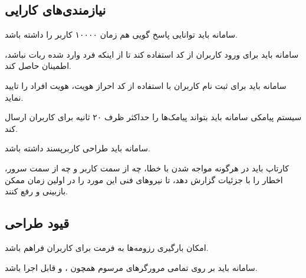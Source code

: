 \documentclass[12pt,svgnames,oneside]{book}
\newcounter{itemadded}
\let\LaTeXStandardEnumerateBegin\enumerate
\let\LaTeXStandardEnumerateEnd\endenumerate
\renewenvironment{enumerate}{%
\LaTeXStandardEnumerateBegin%
\setcounter{itemadded}{0}
}{%
\LaTeXStandardEnumerateEnd%
}%
\begin{document}
\subsection{نیازمندی‌های کارایی}
\begin{enumerate}
\item
سامانه باید توانایی پاسخ گویی هم زمان ۱۰۰۰۰ کاربر را داشته باشد.
\item
سامانه باید برای ورود کاربران از کد 
استفاده کند تا از اینکه فرد وارد شده ربات نباشد، اطمینان حاصل کند.
\item
سامانه باید برای ثبت نام کاربران با استفاده از کد احراز هویت، هویت افراد را تایید نماید.
\item
سیستم پیامکی سامانه باید بتواند پیامک‌ها را حداکثر ظرف ۲۰ ثانیه برای کاربران ارسال کند.
\item
سامانه باید طراحی کاربرپسند داشته باشد.
\item
کارتاپ باید در هرگونه مواجه شدن با خطا، چه از سمت کاربر و چه از سمت سرور، اخطار را با جزئیات گزارش دهد، تا نیروهای فنی این مورد را در اولین زمان ممکن بازبینی و رفع کنند.

\end{enumerate}

\subsection{قیود طراحی}
\begin{enumerate}
\item
امکان بارگیری رزومه‌ها به فرمت  برای کاربران فراهم باشد.
\item
سامانه باید بر روی تمامی مرورگر‌های مرسوم همچون
،
 و
  قابل اجرا باشد.
\end{enumerate}

\clearpage
\end{document}
